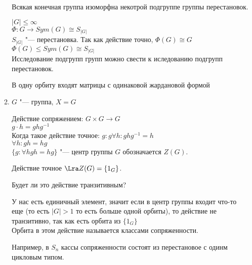 \begin{exmp}
\begin{enumerate}
\begin{conseq}
Всякая конечная группа изоморфна некотрой подгруппе группы перестановок.

$|G| \le \infty$ \\
$\Phi \colon G \to Sym(G)\cong S_{|G|}$\\
$S_{|G|}$ "--- перестановка.
Так как действие точно, $\Phi(G) \cong G$\\
$\Phi(G) \le Sym(G) \cong S_{|G|}$\\

Исследование подгрупп групп можно свести к иследованию подгрупп перестановок.
\begin{Rem}
  В одну орбиту входят матрицы с одинаковой жардановой формой
\end{Rem}
\end{conseq}
\item
$G$ "--- группа, $X = G$

Действие сопряжением:
$G \times G \to G$\\
$g \cdot h = ghg^{-1}$\\
Когда такое действие точное:
$g \colon g \forall h \colon ghg^{-1} = h$\\
$\forall h \colon gh = hg$ \\
$\{g \colon \forall h gh = hg\} $ "--- центр группы $G$ обозначается $Z(G)$.

Действие точное $\Lra Z(G) = \{1_{G}\}$.

Будет ли это действие транзитивным?

У нас есть единичный элемент, значит если в центр группы входит что-то еще (то есть $|G| > 1$ то есть больше одной орбиты), то 
действие не транзитивно, так  как есть орбита из $\{1_G\}$\\

Орбита в этом действие называется классами сопряженности.

Например, в $S_n$ кассы сопряженности состоят из перестановое с одинм цикловым типом.
\end{enumerate}
\end{exmp}
                       
